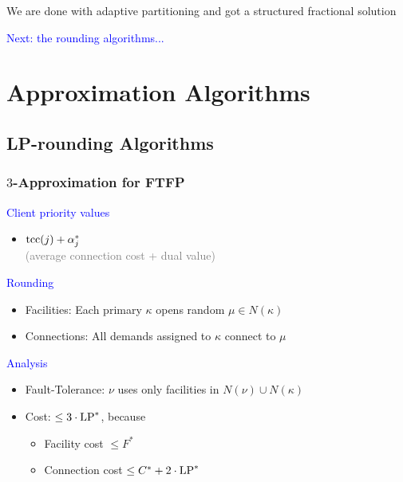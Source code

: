 \documentclass[hyperref,dvipsnames,svgnames,compress]{beamer}
\begin{document}
\begin{frame}
  \begin{block}{}
    \large{
    We are done with adaptive partitioning and got a structured fractional solution
    }
  \end{block}
  \vspace{.5in}
  \begin{block}{}
    \Large{
      \textcolor{blue}{
    Next: the rounding algorithms...
    }
    }
  \end{block}
\end{frame}
\section[Algorithms]{Approximation Algorithms}
\subsection[Rounding]{LP-rounding Algorithms}

\begin{frame}
  \frametitle{$3$-Approximation for FTFP}

{\large

\textcolor{blue}{Client priority values}	
	
	\begin{itemize}
		\item $\mbox{\rm{tcc}}(j) + \alpha_j^\ast$
		\\
		{\normalsize \textcolor{gray}{(average connection cost + dual value)}}
	\end{itemize}
	
\textcolor{blue}{Rounding}

  	\begin{itemize}
  	\item \textcolor{Sepia}{Facilities:}
 					Each primary $\kappa$ opens random $\mu\in N(\kappa)$
  	\item \textcolor{Sepia}{Connections:}
 					All demands assigned to $\kappa$ connect to $\mu$
  	\end{itemize}

\textcolor{blue}{Analysis}

  \begin{itemize}
  	\item \textcolor{Sepia}{Fault-Tolerance:}
 			$\nu$ uses only facilities in $N(\nu) \cup N(\kappa)$
  	\item \textcolor{Sepia}{Cost:} $\le 3\cdot\mbox{\rm LP}^\ast$, because
    	\begin{itemize}
    		\item Facility cost $\le F^\ast$
    		\item Connection cost $\le C^\ast + 2\cdot\mbox{\rm LP}^\ast$
    	\end{itemize}
 	\end{itemize}
}
\end{frame}
\end{document}
